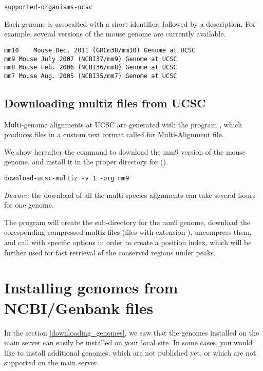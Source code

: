 \begin{lstlisting}
supported-organisms-ucsc
\end{lstlisting}

Each genome is assocaited with a short identifier, followed by a
description. For example, several versions of the mouse genome are
currently available.

\begin{small}
\begin{verbatim}
mm10	Mouse Dec. 2011 (GRCm38/mm10) Genome at UCSC
mm9	Mouse July 2007 (NCBI37/mm9) Genome at UCSC
mm8	Mouse Feb. 2006 (NCBI36/mm8) Genome at UCSC
mm7	Mouse Aug. 2005 (NCBI35/mm7) Genome at UCSC
\end{verbatim}
\end{small}

\subsection{Downloading multiz files from UCSC}

Multi-genome alignments at UCSC are generated with the program
, which produces files in a custom text format called
 for Multi-Alignment file.

We show hereafter the command to download the mm9 version of the mouse
genome, and install it in the proper directory for
 ().

\begin{lstlisting}
download-ucsc-multiz -v 1 -org mm9
\end{lstlisting}

\emph{Beware: } the download of all the multi-species alignments can
take several hours for one genome.

The program will create the sub-directory for the mm9 genome, download
the coresponding compressed multiz files (files with extension
), uncompress them, and call 
with specific options in order to create a position index, which will
be further used for fast retrieval of the conserved regions under
peaks.


\section{Installing genomes from  NCBI/Genbank files}

In the section \ref{downloading_genomes}, we saw that the genomes
installed on the main \RSAT server can easily be installed on your
local site. In some cases, you would like to install additional
genomes, which are not published yet, or which are not supported on
the main \RSAT server.

